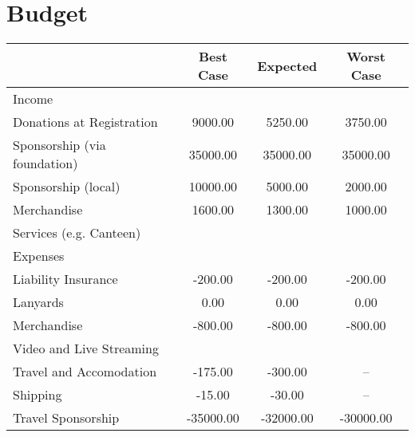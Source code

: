 
\section{Budget}

 
\begin{tabularx}{\linewidth}{XSSS}
   & {Best Case} & {Expected} & {Worst Case} \\
  \hline\hline
Income \hspace*{1em}  & {} & {} & {}\\
\hspace*{1em} Donations at Registration  & 9000.00 & 5250.00 & 3750.00\\
\hspace*{1em} Sponsorship (via foundation)  & 35000.00 & 35000.00 & 35000.00\\
\hspace*{1em} Sponsorship (local)  & 10000.00 & 5000.00 & 2000.00\\
\hspace*{1em} Merchandise  & 1600.00 & 1300.00 & 1000.00\\
\hspace*{1em} Services (e.g. Canteen)  & {} & {} & {}\\[0.5ex]
Expenses \hspace*{1em}  & {} & {} & {}\\
\hspace*{1em} Liability Insurance  & -200.00 & -200.00 & -200.00\\
\hspace*{1em} Lanyards  & 0.00 & 0.00 & 0.00\\
\hspace*{1em} Merchandise  & -800.00 & -800.00 & -800.00\\
\hspace*{1em} Video and Live Streaming  & {} & {} & {}\\
\hspace*{1em} \hspace*{1em} Travel and Accomodation & -175.00 & -300.00 & {–}\\
\hspace*{1em} \hspace*{1em} Shipping & -15.00 & -30.00 & {–}\\
\hspace*{1em} Travel Sponsorship  & -35000.00 & -32000.00 & -30000.00\\

\end{tabularx}
